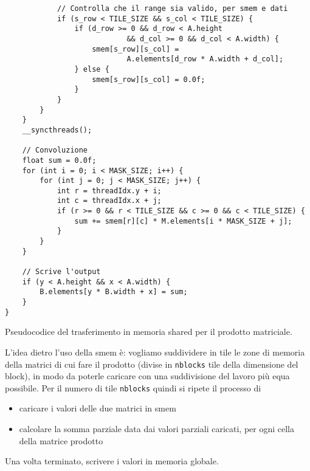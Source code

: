 \begin{questions}
\begin{solution}
\begin{verbatim}
            // Controlla che il range sia valido, per smem e dati
            if (s_row < TILE_SIZE && s_col < TILE_SIZE) {
                if (d_row >= 0 && d_row < A.height 
                            && d_col >= 0 && d_col < A.width) {
                    smem[s_row][s_col] =
                            A.elements[d_row * A.width + d_col];
                } else {
                    smem[s_row][s_col] = 0.0f;
                }
            }
        }
    }
    __syncthreads();
    
    // Convoluzione
    float sum = 0.0f;
    for (int i = 0; i < MASK_SIZE; i++) {
        for (int j = 0; j < MASK_SIZE; j++) {
            int r = threadIdx.y + i;
            int c = threadIdx.x + j;
            if (r >= 0 && r < TILE_SIZE && c >= 0 && c < TILE_SIZE) {
                sum += smem[r][c] * M.elements[i * MASK_SIZE + j];
            }
        }
    }
    
    // Scrive l'output
    if (y < A.height && x < A.width) {
        B.elements[y * B.width + x] = sum;
    }
}
        \end{verbatim}
    \end{solution}
    
    \question Pseudocodice del trasferimento in memoria shared per il prodotto matriciale.
    
    \begin{solution}
        L'idea dietro l'uso della smem è: vogliamo suddividere in tile le zone di memoria della matrici di cui fare il prodotto (divise in \texttt{nblocks} tile della dimensione del block), in modo da poterle caricare con una suddivisione del lavoro più equa possibile. Per il numero di tile \texttt{nblocks} quindi si ripete il processo di 
        \begin{itemize}
            \item caricare i valori delle due matrici in smem
            
            \item calcolare la somma parziale data dai valori parziali caricati, per ogni cella della matrice prodotto
        \end{itemize}
        
        Una volta terminato, scrivere i valori in memoria globale.
        

\end{solution}
\end{questions}

